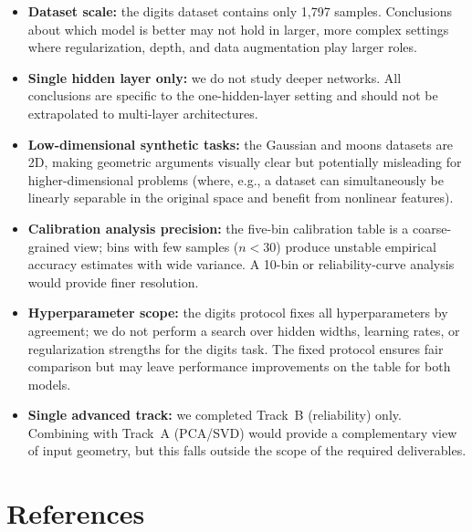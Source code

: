 \documentclass[11pt]{article}
\begin{document}
\begin{itemize}[leftmargin=*]
    \item \textbf{Dataset scale:} the digits dataset contains only 1{,}797 samples.
          Conclusions about which model is better may not hold in larger, more complex
          settings where regularization, depth, and data augmentation play larger roles.
    \item \textbf{Single hidden layer only:} we do not study deeper networks.
          All conclusions are specific to the one-hidden-layer setting and should not
          be extrapolated to multi-layer architectures.
    \item \textbf{Low-dimensional synthetic tasks:} the Gaussian and moons datasets
          are 2D, making geometric arguments visually clear but potentially misleading
          for higher-dimensional problems (where, e.g., a dataset can simultaneously be
          linearly separable in the original space and benefit from nonlinear features).
    \item \textbf{Calibration analysis precision:} the five-bin calibration table is
          a coarse-grained view; bins with few samples ($n < 30$) produce unstable
          empirical accuracy estimates with wide variance.
          A 10-bin or reliability-curve analysis would provide finer resolution.
    \item \textbf{Hyperparameter scope:} the digits protocol fixes all hyperparameters
          by agreement; we do not perform a search over hidden widths, learning rates,
          or regularization strengths for the digits task.
          The fixed protocol ensures fair comparison but may leave performance improvements
          on the table for both models.
    \item \textbf{Single advanced track:} we completed Track~B (reliability) only.
          Combining with Track~A (PCA/SVD) would provide a complementary view of input
          geometry, but this falls outside the scope of the required deliverables.
\end{itemize}


\section*{References}
\end{document}

